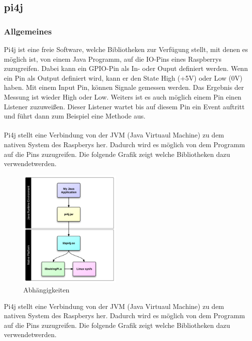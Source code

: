 \subsection{pi4j} \label{subsec:pi4j}
\subsubsection{Allgemeines}
Pi4j ist eine freie Software, welche Bibliotheken zur Verfügung stellt, mit denen es möglich ist, von einem Java Programm, auf die IO-Pins eines Raspberrys zuzugreifen. Dabei kann ein GPIO-Pin als In- oder Ouput definiert werden. Wenn ein Pin als Output definiert wird, kann er den State High (+5V) oder Low (0V) haben. Mit einem Input Pin, können Signale gemessen werden. Das Ergebnis der Messung ist wieder High oder Low. Weiters ist es auch möglich einem Pin einen Listener zuzuweißen. Dieser Listener wartet bis auf diesem Pin ein Event auftritt und führt dann zum Beispiel eine Methode aus. 
\\ \\
Pi4j stellt eine Verbindung von der JVM (Java Virtuaul Machine) zu dem nativen System des Raspberys her. Dadurch wird es möglich von dem Programm auf die Pins zuzugreifen. Die folgende Grafik zeigt welche Bibliotheken dazu verwendetwerden.

\begin{figure}
\vspace{-35pt}
  \begin{center}
    \includegraphics[width=0.45\textwidth]{Bilder/pi4j/dependencies}
  \end{center}
  \caption{Abhängigkeiten}
  \label{Magazin Vorne}
  \vspace{-170pt}
\end{figure}

Pi4j stellt eine Verbindung von der JVM (Java Virtuaul Machine) zu dem nativen System des Raspberys her. Dadurch wird es möglich von dem Programm auf die Pins zuzugreifen. Die folgende Grafik zeigt welche Bibliotheken dazu verwendetwerden.

